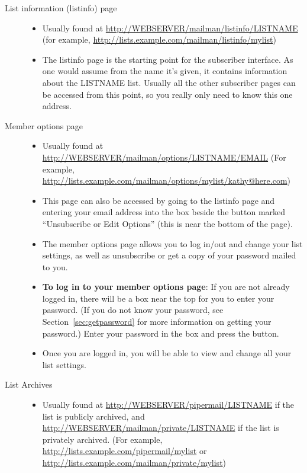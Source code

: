 \documentclass{howto}
\begin{document}
\begin{description}
	\item [List information (listinfo) page]
		\begin{itemize}
			\item Usually found at \url{http://WEBSERVER/mailman/listinfo/LISTNAME}
			 (for example, \url{http://lists.example.com/mailman/listinfo/mylist})

			\item The listinfo page is the starting point for the subscriber
			interface.  As one would assume from the name it's given, it 
			contains information about the LISTNAME list.
			Usually all the other subscriber pages can be accessed from this
			point, so you really only need to know this one address.

		\end{itemize}

	\item [Member options page]
		\begin{itemize}
			\item Usually found at \url{http://WEBSERVER/mailman/options/LISTNAME/EMAIL}
			(For example, \url{http://lists.example.com/mailman/options/mylist/kathy@here.com})

			\item This page can also be accessed by going to the listinfo page
			and entering your email address into the box beside the button
			marked ``Unsubscribe or Edit Options'' (this is near the bottom of the
			page).

			\item The member options page allows you to log in/out and change your 
			list settings, as well as unsubscribe or get a copy of your password
			mailed to you. 

			\item \textbf{To log in to your member options page}: 
			If you are not already logged in, there will be a box near the top for
			you to enter your password.  (If you do not know your password, see 
			Section~\ref{sec:getpassword} for more information on getting your 
			password.)  Enter your password in the box and press the button.

			\item Once you are logged in, you will be able to view and change
			all your list settings.

		\end{itemize}
	\item [List Archives] 
		\begin{itemize}
			\item Usually found at \url{http://WEBSERVER/pipermail/LISTNAME} if the 
			list is publicly archived, and 
			\url{http://WEBSERVER/mailman/private/LISTNAME} if the list is privately
			archived.  (For example, 
			\url{http://lists.example.com/pipermail/mylist} or
			\url{http://lists.example.com/mailman/private/mylist})


\end{itemize}
\end{description}
\end{document}

